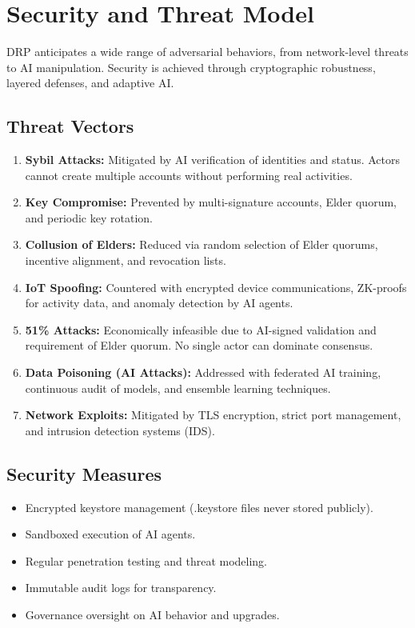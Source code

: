 \documentclass[11pt,a4paper]{article}
\begin{document}
\section{Security and Threat Model}

DRP anticipates a wide range of adversarial behaviors, from network-level threats to AI manipulation. Security is achieved through cryptographic robustness, layered defenses, and adaptive AI.

\subsection{Threat Vectors}
\begin{enumerate}
    \item \textbf{Sybil Attacks:} Mitigated by AI verification of identities and status. Actors cannot create multiple accounts without performing real activities.
    \item \textbf{Key Compromise:} Prevented by multi-signature accounts, Elder quorum, and periodic key rotation.
    \item \textbf{Collusion of Elders:} Reduced via random selection of Elder quorums, incentive alignment, and revocation lists.
    \item \textbf{IoT Spoofing:} Countered with encrypted device communications, ZK-proofs for activity data, and anomaly detection by AI agents.
    \item \textbf{51\% Attacks:} Economically infeasible due to AI-signed validation and requirement of Elder quorum. No single actor can dominate consensus.
    \item \textbf{Data Poisoning (AI Attacks):} Addressed with federated AI training, continuous audit of models, and ensemble learning techniques.
    \item \textbf{Network Exploits:} Mitigated by TLS encryption, strict port management, and intrusion detection systems (IDS).
\end{enumerate}

\subsection{Security Measures}
\begin{itemize}
    \item Encrypted keystore management (.keystore files never stored publicly).
    \item Sandboxed execution of AI agents.
    \item Regular penetration testing and threat modeling.
    \item Immutable audit logs for transparency.
    \item Governance oversight on AI behavior and upgrades.
\end{itemize}
\end{document}
